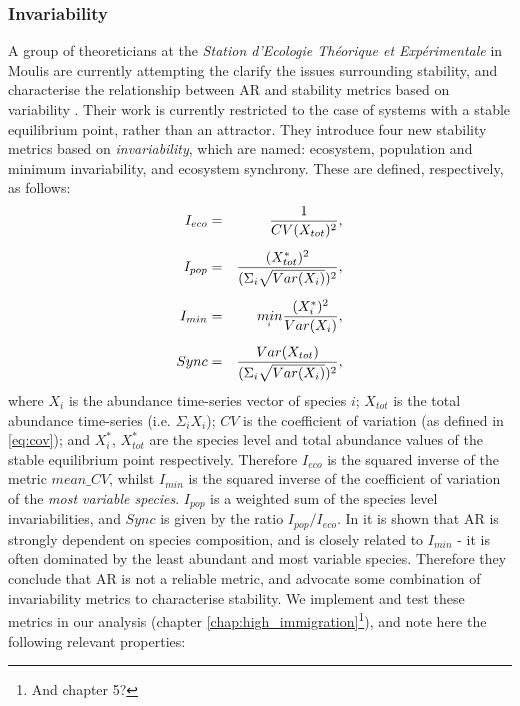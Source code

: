 \subsubsection{Invariability}
\label{sec:def_invariability}


A group of theoreticians at the \emph{Station d'Ecologie Th\'eorique et Exp\'erimentale} in Moulis are currently attempting the clarify the issues surrounding stability, and characterise the relationship between AR and stability metrics based on variability \cite{arnoldi2015,montoya2016invariability}. Their work is currently restricted to the case of systems with a stable equilibrium point, rather than an attractor. They introduce four new stability metrics based on \emph{invariability}, which are named: ecosystem, population and minimum invariability, and ecosystem synchrony. These are defined, respectively, as follows:
\begin{eqnarray}
I_{eco} &=& \frac{1}{CV(X_{tot})^2}, \\[5pt] 
I_{pop} &=& \frac{(X_{tot}^*)^2}{(\Sigma_i \sqrt{Var(X_i)})^2}, \\[5pt]
I_{min} &=& \underaccent{i}{min} \frac{(X_i^*)^2}{Var(X_i)}, \\[5pt]
Sync    &=& \frac{Var(X_{tot})}{(\Sigma_i \sqrt{Var(X_i)})^2},
\end{eqnarray}
where $X_i$ is the abundance time-series vector of species $i$; $X_{tot}$ is the total abundance time-series (i.e.  $\Sigma_i X_i$);  $CV$ is the coefficient of variation (as defined in \eqref{eq:cov}); and $X_i^*$, $X_{tot}^*$ are the species level and total abundance values of the stable equilibrium point respectively. Therefore $I_{eco}$ is the squared inverse of the metric $mean\_CV$, whilst $I_{min}$ is the squared inverse of the coefficient of variation of the \emph{most variable species}. $I_{pop}$ is a weighted sum of the species level invariabilities, and $Sync$ is given by the ratio $I_{pop} / I_{eco}$. In \cite{montoya2016invariability} it is shown that AR is strongly dependent on species composition, and is closely related to $I_{min}$ - it is often dominated by the least abundant and most variable species. Therefore they conclude that AR is not a reliable metric, and advocate some combination of invariability metrics to characterise stability. We implement and test these metrics in our analysis (chapter \ref{chap:high_immigration}\footnote{And chapter 5?}), and note here the following relevant properties:

